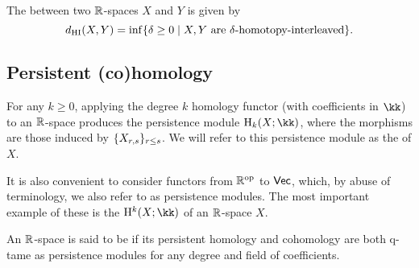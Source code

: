 The  between two $\R$-spaces $X$ and $Y$ is given by
\[
\dhi(X,Y) = \inf \set{\delta \geq 0 \mid X,Y \text{ are }\delta\text{-homotopy-interleaved}}.
\]

\subsection{Persistent (co)homology}


For any $k \geq 0$, applying the degree $k$ homology functor (with coefficients in $\kk$) to an $\R$-space produces the persistence module $\rH_k(X; \kk)$, where the morphisms are those induced by $\set{X_{r,s}}_{r \leq s}$.
We will refer to this persistence module as the  of $X$.

It is also convenient to consider functors from $\R^\op$ to $\Vec$, which, by abuse of terminology, we also refer to as persistence modules.
The most important example of these is the  $\rH^k(X; \kk)$ of an $\R$-space $X$.

An $\R$-space is said to be  if its persistent homology and cohomology are both q-tame as persistence modules for any degree and field of coefficients.

